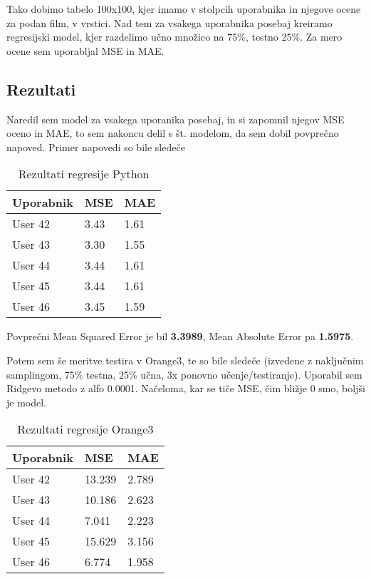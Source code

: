 \documentclass[a4paper,11pt]{article}
\begin{document}
Tako dobimo tabelo 100x100, kjer imamo v stolpcih uporabnika in njegove ocene za podan film, v vrstici. Nad tem za vsakega uporabnika posebaj kreiramo regresijski model, kjer razdelimo učno množico na 75\%, testno 25\%. Za mero ocene sem uporabljal MSE in MAE.

\subsection{Rezultati}

Naredil sem model za vsakega uporanika posebaj, in si zapomnil njegov MSE oceno in MAE, to sem nakoncu delil s št. modelom, da sem dobil povprečno napoved. Primer napovedi so bile sledeče

\begin{table}[htbp]
	\caption{Rezultati regresije Python}
	\label{tab_py_regr}
	\begin{center}
		\begin{tabular}{llp{3cm}}
			
			\hline
			Uporabnik & MSE & MAE \\
			\hline
			User 42 & 3.43 & 1.61 \\
			User 43 & 3.30 & 1.55 \\
			User 44 & 3.44 & 1.61\\
			User 45 & 3.44 & 1.61   \\
			User 46 & 3.45 & 1.59  \\
			\hline
		\end{tabular}
	\end{center}
\end{table}

Povprečni Mean Squared Error je bil  \textbf{3.3989}, Mean Absolute Error pa \textbf{1.5975}.

Potem sem še meritve testira v Orange3, te so bile sledeče (izvedene z naključnim samplingom, 75\% testna, 25\% učna, 3x ponovno učenje/testiranje). Uporabil sem Ridgevo metodo z alfo 0.0001. Načeloma, kar se tiče MSE, čim bližje 0 smo, boljši je model.

\begin{table}[htbp]
	\caption{Rezultati regresije Orange3}
	\label{tab_or_regr}
	\begin{center}
		\begin{tabular}{llp{3cm}}
			
			\hline
			Uporabnik & MSE & MAE \\
			\hline
			User 42 & 13.239 & 2.789 \\
			User 43 & 10.186 & 2.623 \\
			User 44 & 7.041 & 2.223 \\
			User 45 & 15.629 & 3.156   \\
			User 46 & 6.774 & 1.958  \\
			\hline
		\end{tabular}
	\end{center}
\end{table}
\end{document}

